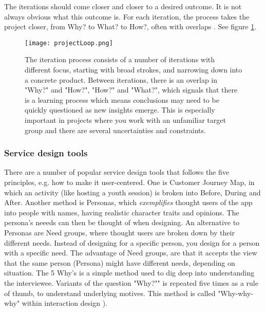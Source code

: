 The iterations should come closer and closer to a desired outcome. It is not always obvious what this outcome is. For each iteration, the process takes the project closer, from Why? to What? to How?, often with overlaps \citep{expedition-mondial}. See figure \ref{fig:iterationprocess}.


\begin{figure}[h]
    \centering
    \texttt{[image: projectLoop.png]}
    \caption{The iteration process consists of a number of iterations with different focus, starting with broad strokes, and narrowing down into a concrete product. Between iterations, there is an overlap in "Why?" and "How?", "How?" and "What?", which signals that there is a learning process which means conclusions may need to be quickly questioned as new insights emerge. This is especially important in projects where you work with an unfamiliar target group and there are several uncertainties and constraints.}
    \label{fig:iterationprocess}
\end{figure}

\subsubsection{Service design tools}

There are a number of popular service design tools that follows the five principles, e.g. how to make it user-centered. One is Customer Journey Map, in which an activity (like hosting a youth session) is broken into Before, During and After. Another method is Personas, which \textit{exemplifies} thought users of the app into people with names, having realistic character traits and opinions. The persona's neeeds can then be thought of when designing. An alternative to Personas are Need groups, where thought users are broken down by their different needs. Instead of designing for a specific person, you design for a person with a specific need. The advantage of Need groups, are that it accepts the view that the same person (Persona) might have different needs, depending on situation. The 5 Why's is a simple method used to dig deep into understanding the interviewee. Variants of the question "Why?"" is repeated five times as a rule of thumb, to understand underlying motives. This method is called "Why-why-why" within interaction design \citep{lowgren}).

